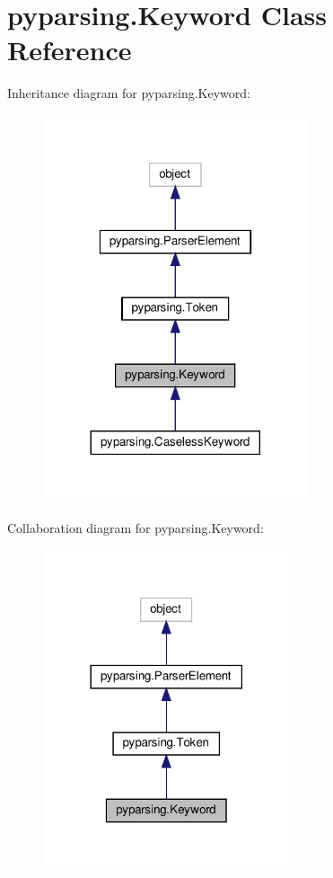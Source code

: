 \hypertarget{classpyparsing_1_1Keyword}{}\section{pyparsing.\+Keyword Class Reference}
\label{classpyparsing_1_1Keyword}


Inheritance diagram for pyparsing.\+Keyword\+:
\nopagebreak
\begin{figure}[H]
\begin{center}
\leavevmode
\includegraphics[width=221pt]{classpyparsing_1_1Keyword__inherit__graph}
\end{center}
\end{figure}


Collaboration diagram for pyparsing.\+Keyword\+:
\nopagebreak
\begin{figure}[H]
\begin{center}
\leavevmode
\includegraphics[width=206pt]{classpyparsing_1_1Keyword__coll__graph}
\end{center}
\end{figure}
